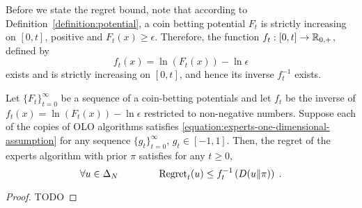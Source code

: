 Before we state the regret bound, note that according to
Definition~\ref{definition:potential}, a coin betting potential $F_t$ is
strictly increasing on $[0,t]$, positive and $F_t(x) \ge \epsilon$. Therefore,
the function $f_t:[0,t] \to \mathbb{R}_{0,+}$, defined by
$$
f_t(x) = \ln \left(F_t(x)\right) - \ln \epsilon
$$
exists and is strictly increasing on $[0, t]$, and hence its inverse $f_t^{-1}$
exists.

\begin{theorem}
Let $\{F_t\}_{t=0}^\infty$ be a sequence of a coin-betting potentials and let
$f_t$ be the inverse of $f_t(x) = \ln \left(F_t(x)\right) - \ln \epsilon$
restricted to non-negative numbers. Suppose each of the copies of OLO algorithms
satisfies
\eqref{equation:experts-one-dimensional-assumption}
for any sequence $\{g_t\}_{t=0}^\infty$, $g_t \in [-1,1]$. Then, the regret
of the experts algorithm with prior $\pi$ satisfies for any $t \ge 0$,
$$
\forall u \in \Delta_N \qquad \qquad
\operatorname{Regret}_t(u) \le f_t^{-1}\left( D({u}\|{\pi}) \right) \; .
$$
\end{theorem}

\begin{proof}
TODO
\end{proof}
